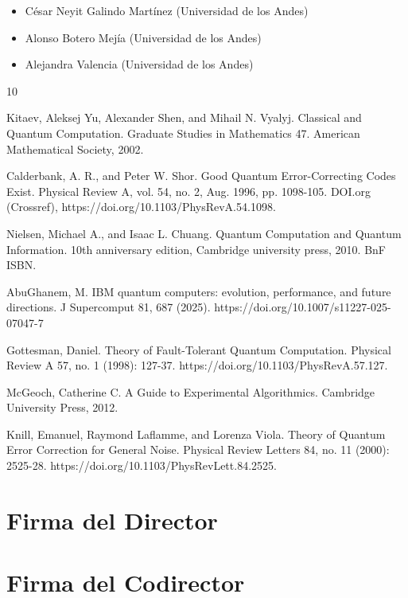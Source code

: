 \documentclass[12pt]{article}
\begin{document}

\begin{itemize}
  \item C\'esar Neyit Galindo Mart\'inez (Universidad de los Andes)
  \item Alonso Botero Mej\'ia (Universidad de los Andes)
  \item Alejandra Valencia (Universidad de los Andes)
\end{itemize}

\begin{thebibliography}{10}

   Kitaev, Aleksej Yu, Alexander Shen, and Mihail N. Vyalyj. Classical and Quantum Computation. Graduate Studies in Mathematics 47. American Mathematical Society, 2002.

   Calderbank, A. R., and Peter W. Shor. Good Quantum Error-Correcting Codes Exist. Physical Review A, vol. 54, no. 2, Aug. 1996, pp. 1098-105. DOI.org (Crossref), https://doi.org/10.1103/PhysRevA.54.1098.

   Nielsen, Michael A., and Isaac L. Chuang. Quantum Computation and Quantum Information. 10th anniversary edition, Cambridge university press, 2010. BnF ISBN.

   AbuGhanem, M. IBM quantum computers: evolution, performance, and future directions. J Supercomput 81, 687 (2025). https://doi.org/10.1007/s11227-025-07047-7

   Gottesman, Daniel. Theory of Fault-Tolerant Quantum Computation. Physical Review A 57, no. 1 (1998): 127-37. https://doi.org/10.1103/PhysRevA.57.127.

   McGeoch, Catherine C. A Guide to Experimental Algorithmics. Cambridge University Press, 2012.

   Knill, Emanuel, Raymond Laflamme, and Lorenza Viola. Theory of Quantum Error Correction for General Noise. Physical Review Letters 84, no. 11 (2000): 2525-28. https://doi.org/10.1103/PhysRevLett.84.2525.

\end{thebibliography}

\section*{Firma del Director}
\vspace{1.5cm}

\section*{Firma del Codirector	}
\end{document}
